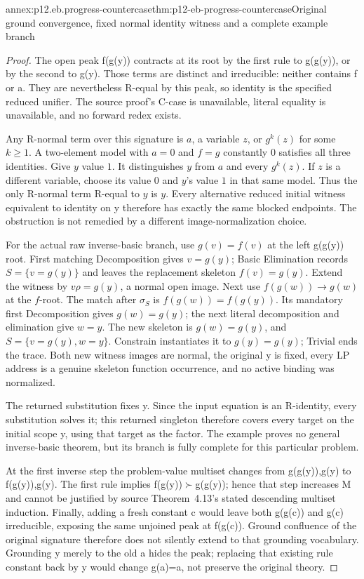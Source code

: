 \begin{annexitem}{annex:p12.eb.progress-countercase}{thm:p12-eb-progress-countercase}{Original ground convergence, fixed normal identity witness and a complete example branch}
\begin{proof}
The open peak f(g(y)) contracts at its root by the first rule
to g(g(y)), or by the second to g(y). Those terms are distinct
and irreducible: neither contains f or a. They are nevertheless
R-equal by this peak, so identity is the specified reduced
unifier. The source proof's C-case is unavailable, literal
equality is unavailable, and no forward redex exists.

Any R-normal term over this signature is \(a\), a variable \(z\), or
\(g^k(z)\) for some \(k\geq1\). A two-element model with \(a=0\) and \(f=g\)
constantly \(0\) satisfies all three identities. Give \(y\) value \(1\).
It distinguishes \(y\) from \(a\) and every \(g^k(z)\). If \(z\) is a
different variable, choose its value \(0\) and \(y\)'s value \(1\) in that
same model. Thus the only R-normal term R-equal to \(y\) is \(y\).
Every alternative reduced initial witness equivalent to identity
on y therefore has exactly the same blocked endpoints. The
obstruction is not remedied by a different image-normalization choice.

For the actual raw inverse-basic branch, use \(g(v)=f(v)\) at
the left g(g(y)) root. First matching Decomposition gives
 \(v=g(y)\); Basic Elimination records \(S=\{v=g(y)\}\) and leaves
the replacement skeleton \(f(v)=g(y)\). Extend the witness by
\(v\rho=g(y)\), a normal open image. Next use
\(f(g(w))\to g(w)\) at the \(f\)-root. The match after \(\sigma_S\)
is \(f(g(w))=f(g(y))\). Its mandatory first Decomposition gives
\(g(w)=g(y)\); the next literal decomposition and elimination
give \(w=y\). The new skeleton is \(g(w)=g(y)\), and
\(S=\{v=g(y),w=y\}\). Constrain instantiates it to \(g(y)=g(y)\);
Trivial ends the trace. Both new witness images are normal,
the original y is fixed, every LP address is a genuine skeleton
function occurrence, and no active binding was normalized.

The returned substitution fixes y. Since the input equation is
an R-identity, every substitution solves it; this returned
singleton therefore covers every target on the initial scope
{y}, using that target as the factor. The example proves no
general inverse-basic theorem, but its branch is fully complete
for this particular problem.

At the first inverse step the problem-value multiset changes
from {g(g(y)),g(y)} to {f(g(y)),g(y)}. The first rule
implies f(g(y))\(\succ\)g(g(y)); hence that step increases
M and cannot be justified by source Theorem~4.13's stated
descending multiset induction. Finally, adding a fresh constant c
would leave both g(g(c)) and g(c) irreducible, exposing the
same unjoined peak at f(g(c)). Ground confluence of the
original signature therefore does not silently extend to that
grounding vocabulary. Grounding y merely to the old a hides
the peak; replacing that existing rule constant back by y
would change g(a)=a, not preserve the original theory.
\end{proof}
\end{annexitem}
